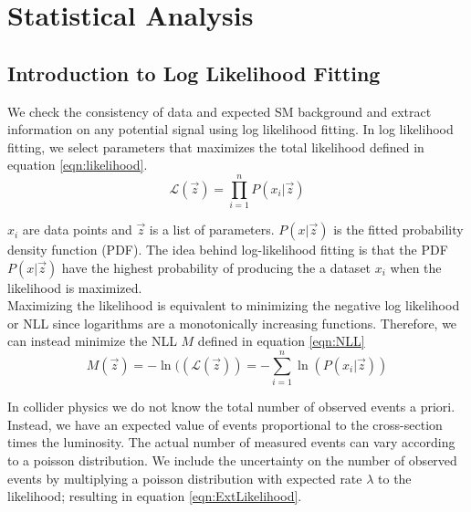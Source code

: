 \chapter{Statistical Analysis}
\label{chap:statistics}

\section{Introduction to Log Likelihood Fitting}
\label{sec:stat:likelihood}

\indent We check the consistency of data and expected SM background and extract information on any potential signal using log likelihood fitting.  In log likelihood fitting, we select parameters that maximizes the total likelihood defined in equation \ref{eqn:likelihood}.  \\

\begin{equation}
\label{eqn:likelihood}
{\mathcal{L}}(\vec{z}) = {\displaystyle\prod_{i=1}^{n}} P(x_i|\vec{z})
\end{equation}

\indent $x_i$ are data points and $\vec{z}$ is a list of parameters. $P(x|\vec{z})$ is the fitted probability density function (PDF).  The idea behind log-likelihood fitting is that the PDF $P(x|\vec{z})$ have the highest probability of producing the a dataset $x_i$ when the likelihood is maximized. \\

\indent Maximizing the likelihood is equivalent to minimizing the negative log likelihood or NLL since logarithms are a monotonically increasing functions.  Therefore, we can instead minimize the NLL $M$ defined in equation \ref{eqn:NLL} \\

\begin{equation}
\label{eqn:NLL}
M(\vec{z})=-\ln(({\mathcal{L}}(\vec{z})) = -{\displaystyle\sum_{i=1}^{n}} \ln( P(x_i|\vec{z}) )
\end{equation}

\indent In collider physics we do not know the total number of observed events a priori.  Instead, we have an expected value of events proportional to the cross-section times the luminosity.  The actual number of measured events can vary according to a poisson distribution.  We include the uncertainty on the number of observed events by multiplying a poisson distribution with expected rate $\lambda$ to the likelihood; resulting in equation \ref{eqn:ExtLikelihood}.  \\

